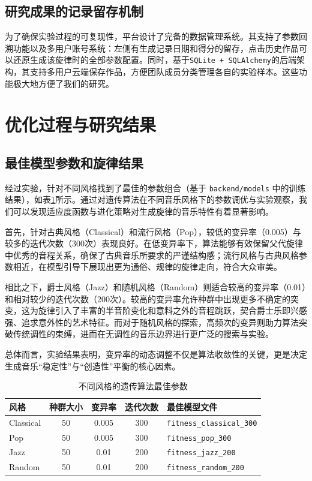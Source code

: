 \documentclass[12pt, a4paper]{ctexart}
\begin{document}
\subsection{研究成果的记录留存机制}
为了确保实验过程的可复现性，平台设计了完备的数据管理系统。其支持了参数回溯功能以及多用户账号系统：左侧有生成记录日期和得分的留存，点击历史作品可以还原生成该旋律时的全部参数配置。同时，基于\verb|SQLite + SQLAlchemy|的后端架构，其支持多用户云端保存作品，方便团队成员分类管理各自的实验样本。这些功能极大地方便了我们的研究。

\section{优化过程与研究结果}
\subsection{最佳模型参数和旋律结果}
经过实验，针对不同风格找到了最佳的参数组合（基于 \verb|backend/models| 中的训练结果），如表\ref{tab}所示。通过对遗传算法在不同音乐风格下的参数调优与实验观察，我们可以发现适应度函数与进化策略对生成旋律的音乐特性有着显著影响。

首先，针对古典风格（Classical）和流行风格（Pop），较低的变异率（0.005）与较多的迭代次数（300次）表现良好。在低变异率下，算法能够有效保留父代旋律中优秀的音程关系，确保了古典音乐所要求的严谨结构感；流行风格与古典风格参数相近，在模型引导下展现出更为通俗、规律的旋律走向，符合大众审美。

相比之下，爵士风格（Jazz）和随机风格（Random）则适合较高的变异率（0.01）和相对较少的迭代次数（200次）。较高的变异率允许种群中出现更多不确定的突变，这为旋律引入了丰富的半音阶变化和意料之外的音程跳跃，契合爵士乐即兴感强、追求意外性的艺术特征。而对于随机风格的探索，高频次的变异则助力算法突破传统调性的束缚，进而在无调性的音乐边界进行更广泛的搜索与实验。

总体而言，实验结果表明，变异率的动态调整不仅是算法收敛性的关键，更是决定生成音乐“稳定性”与“创造性”平衡的核心因素。

\begin{table}[htbp]
\centering
\caption{不同风格的遗传算法最佳参数}
\begin{tabular}{lcccl}
\toprule
风格 & 种群大小 & 变异率 & 迭代次数 & 最佳模型文件 \\ \midrule
Classical & 50 & 0.005 & 300 & \verb|fitness_classical_300| \\
Pop & 50 & 0.005 & 300 & \verb|fitness_pop_300| \\
Jazz & 50 & 0.01 & 200 & \verb|fitness_jazz_200| \\
Random & 50 & 0.01 & 200 & \verb|fitness_random_200|
\\\bottomrule
\end{tabular}
\label{tab}
\end{table}
\end{document}
